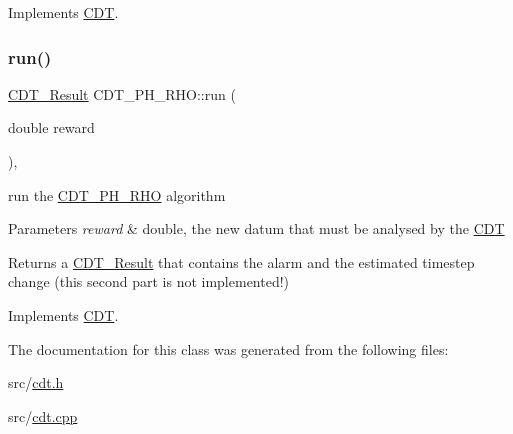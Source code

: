 Implements \mbox{\hyperlink{class_c_d_t_a46446ec219a819466ff418d9ab7aa728}{C\+DT}}.

\mbox{\label{class_c_d_t___p_h___r_h_o_a8c66d0d856204b5368e5b6cba989b0d7}} 
\subsubsection{\texorpdfstring{run()}{run()}}
{\footnotesize\ttfamily \mbox{\hyperlink{class_c_d_t___result}{C\+D\+T\+\_\+\+Result}} C\+D\+T\+\_\+\+P\+H\+\_\+\+R\+H\+O\+::run (\begin{DoxyParamCaption}\item[{double}]{reward }\end{DoxyParamCaption})\hspace{0.3cm}{\ttfamily [override]}, {\ttfamily [virtual]}}



run the \mbox{\hyperlink{class_c_d_t___p_h___r_h_o}{C\+D\+T\+\_\+\+P\+H\+\_\+\+R\+HO}} algorithm 


\begin{DoxyParams}{Parameters}
{\em reward} & double, the new datum that must be analysed by the \mbox{\hyperlink{class_c_d_t}{C\+DT}} \\
\hline
\end{DoxyParams}
\begin{DoxyReturn}{Returns}
a \mbox{\hyperlink{class_c_d_t___result}{C\+D\+T\+\_\+\+Result}} that contains the alarm and the estimated timestep change (this second part is not implemented!) 
\end{DoxyReturn}


Implements \mbox{\hyperlink{class_c_d_t_a2493aeb166403f448ec689d2f7b85dbc}{C\+DT}}.



The documentation for this class was generated from the following files\+:\begin{DoxyCompactItemize}
\item 
src/\mbox{\hyperlink{cdt_8h}{cdt.\+h}}\item 
src/\mbox{\hyperlink{cdt_8cpp}{cdt.\+cpp}}\end{DoxyCompactItemize}
